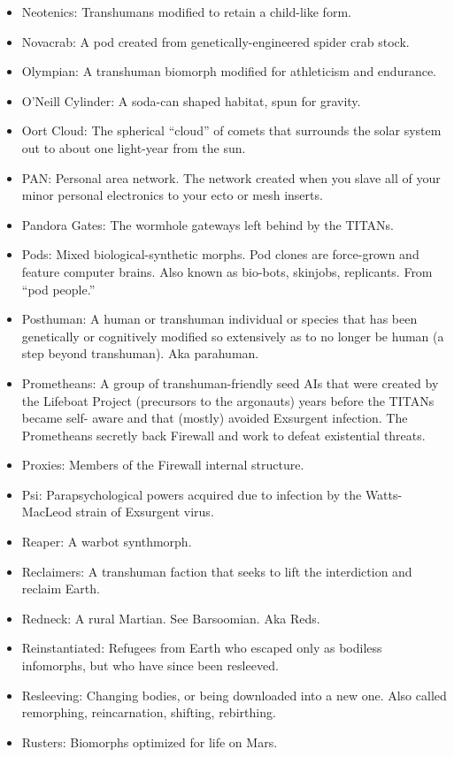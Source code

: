 \begin{itemize}
\item Neotenics: Transhumans modified to retain a child-like form.
\item Novacrab: A pod created from genetically-engineered spider crab  stock.
\item Olympian: A transhuman biomorph modified for athleticism and  endurance.
\item O'Neill Cylinder: A soda-can shaped habitat, spun for gravity.
\item Oort Cloud: The spherical ``cloud'' of comets that surrounds the  solar system out to about one light-year from the sun.
\item PAN: Personal area network. The network created when you slave  all of your minor personal electronics to your ecto or mesh inserts.
\item Pandora Gates: The wormhole gateways left behind by the TITANs.
\item Pods: Mixed biological-synthetic morphs. Pod clones are  force-grown and feature computer brains. Also known as bio-bots,  skinjobs, replicants. From ``pod people.''
\item Posthuman: A human or transhuman individual or species that has  been genetically or cognitively modified so extensively as to no  longer be human (a step beyond transhuman). Aka parahuman.
\item Prometheans: A group of transhuman-friendly seed AIs that were  created by the Lifeboat Project (precursors to the argonauts) years  before the TITANs became self- aware and that (mostly) avoided  Exsurgent infection. The Prometheans secretly back Firewall and work  to defeat existential threats.
\item Proxies: Members of the Firewall internal structure.
\item Psi: Parapsychological powers acquired due to infection by the  Watts-MacLeod strain of Exsurgent virus.
\item Reaper: A warbot synthmorph.
\item Reclaimers: A transhuman faction that seeks to lift the  interdiction and reclaim Earth.
\item Redneck: A rural Martian. See Barsoomian. Aka Reds.
\item Reinstantiated: Refugees from Earth who escaped only as bodiless  infomorphs, but who have since been resleeved.
\item Resleeving: Changing bodies, or being downloaded into a new  one. Also called remorphing, reincarnation, shifting, rebirthing.
\item Rusters: Biomorphs optimized for life on Mars.

\end{itemize}
